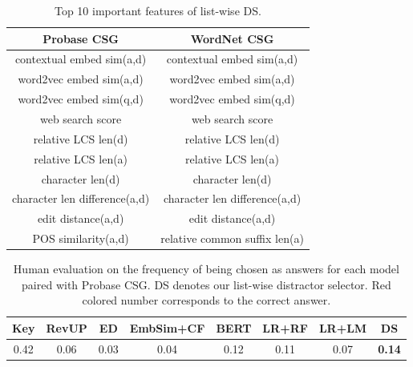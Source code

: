 \begin{table}[t]
			\centering
		\small
		\addtolength{\tabcolsep}{-2pt}
		\begin{tabular}{c|c}
		\toprule
		Probase CSG & WordNet CSG \\

			\midrule
		contextual embed sim(a,d) & contextual embed sim(a,d) \\
		 word2vec embed sim(a,d)   & word2vec embed sim(a,d)  \\
		  word2vec embed sim(q,d)& word2vec embed sim(q,d)  \\
		  web search score & web search score \\
		  relative LCS len(d)   & relative LCS len(d)  \\
		  relative LCS len(a)  & relative LCS len(a)  \\
		  character len(d)   & character len(d)  \\
		  character len difference(a,d)   & character len difference(a,d)  \\
		  edit distance(a,d)   & edit distance(a,d)  \\
		  POS similarity(a,d)   &  relative common suffix len(a) \\
		\bottomrule
	\end{tabular}
	\caption{Top 10 important features of list-wise DS.}
	\label{table:feat_importance}
\end{table}
	\begin{table}[t!]%
		\footnotesize
		\centering
			\begin{tabular}{c|ccccccc} %
				\toprule
				 Key &RevUP &ED  & EmbSim+CF &BERT & LR+RF & LR+LM & DS\\
				\midrule
				  0.42 &0.06  &0.03  &0.04 &0.12  &0.11 &0.07   &\textbf{0.14}\\
				\midrule
			\end{tabular}
			\caption{Human evaluation on the frequency of being chosen as answers for each model paired with Probase CSG. DS denotes our list-wise distractor selector. Red colored number corresponds to the correct answer.} 
			\label{table:app}
		\end{table}
\noindent
